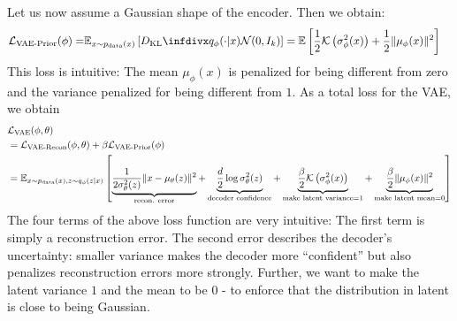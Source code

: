 Let us now assume a Gaussian shape of the encoder. Then we obtain: 
\begin{align}
\mathcal{L}_{\text{VAE-Prior}}(\phi)=&\EE_{x \sim \pdata(x)} \left[\dkl{q_\phi(\cdot|x)}{\mathcal{N}(0,I_k)}\right]=\mathbb{E}\left[\frac{1}{2}
\mathcal{K}\left(\sigma_{\phi}^2(x)\right)+ \frac{1}{2} \|\mu_\phi(x)\|^2\right]
\end{align}
This loss is intuitive: The mean $\mu_\phi(x)$ is penalized for being different from zero and the variance penalized for being different from $1$. As a total loss for the VAE, we obtain 
\begin{equation}
\begin{aligned}
&\mathcal{L}_{\text{VAE}}(\phi,\theta)\\
&=\mathcal{L}_{\text{VAE-Recon}}(\phi,\theta)+\beta\mathcal{L}_{\text{VAE-Prior}}(\phi)\\
&=\mathbb{E}_{x \sim p_{\rm{data}}(x),z\sim q_\phi(z|x)} \left[\underbrace{\frac{1}{2\sigma^2_\theta(z)}\|x-\mu_\theta(z)\|^2}_{\text{recon. error}}+\underbrace{\frac{d}{2}\log \sigma_{\theta}^2(z)
}_{\text{decoder confidence}}+\underbrace{\frac{\beta}{2}
\mathcal{K}\left(\sigma_{\phi}^2(x)\right)}_{\text{make latent variance}=1}+ \underbrace{\frac{\beta}{2} \|\mu_\phi(x)\|^2}_{\text{make latent mean}=0}
\right]
\end{aligned}
\label{eq:total_vae_loss}
\end{equation}
The four terms of the above loss function are very intuitive: The first term is simply a reconstruction error. The second error describes the decoder's uncertainty: smaller variance makes the decoder more ``confident'' but also penalizes reconstruction errors more strongly. Further, we want to make the latent variance $1$ and the mean to be $0$ - to enforce that the distribution in latent is close to being Gaussian.

